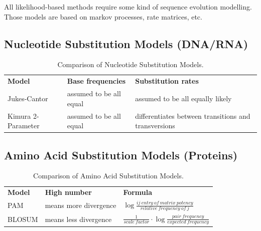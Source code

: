All likelihood-based methods require some kind of sequence evolution modelling. Those models are based on markov processes, rate matrices, etc. 
\subsection*{Nucleotide Substitution Models (DNA/RNA)}
\begin{table}[H]
    \centering
    \begin{tabular}{p{3cm}p{5cm}p{5cm}}
    \textbf{Model} & \textbf{Base frequencies} & \textbf{Substitution rates}  \\
        Jukes-Cantor  & assumed to be all equal & assumed to be all equally likely \\
        Kimura 2-Parameter  & assumed to be all equal & differentiates between transitions and transversions 
    \end{tabular}
    \caption{Comparison of Nucleotide Substitution Models.}
    \label{tab:my_label}
\end{table}

\subsection*{Amino Acid Substitution Models (Proteins)}

\begin{table}[H]
    \centering
    \begin{tabular}{p{2cm}p{3cm}p{6cm}}
    \textbf{Model} & \textbf{High number} & \textbf{Formula}  \\
      PAM & means more divergence & $\log \frac{ij\ entry\ of\ matrix\ potency}{relative\ frequency\ of\ j}$ \\
      BLOSUM &  means less divergence & $\frac{1}{scale\ factor} \cdot \log \frac{pair\ frequency}{expected\ frequency}$ 
    \end{tabular}
    \caption{Comparison of Amino Acid Substitution Models.}
    \label{tab:my_label}
\end{table}